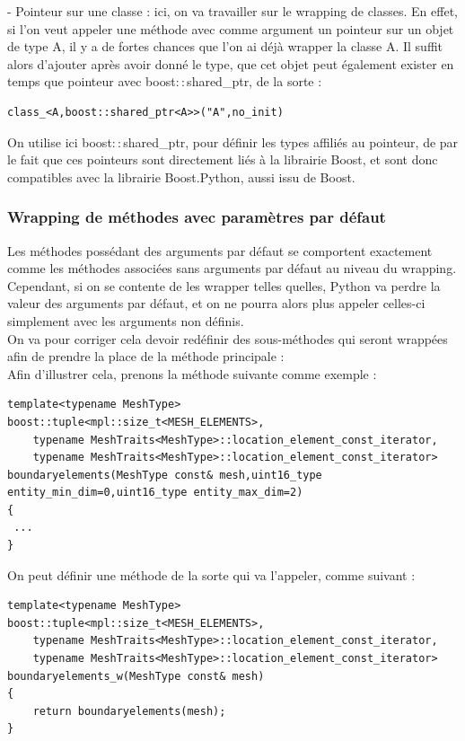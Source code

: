 \documentclass[french,12pt]{article}
\begin{document}
- Pointeur sur une classe : ici, on va travailler sur le wrapping de classes. En effet, si l'on veut appeler une méthode avec comme argument un pointeur sur un objet de type A, il y a de fortes chances que l'on ai déjà wrapper la classe A. 
Il suffit alors d'ajouter après avoir donné le type,  que cet objet peut également exister en temps que pointeur avec boost$::$shared\_ptr, de la sorte :
\begin{lstlisting}
class_<A,boost::shared_ptr<A>>("A",no_init)
\end{lstlisting}

On utilise ici boost$::$shared\_ptr, pour définir les types affiliés au pointeur, de par le fait que ces pointeurs sont directement liés à la librairie Boost, et sont donc compatibles avec la librairie Boost.Python, aussi issu de Boost.

\subsubsection{Wrapping de méthodes avec paramètres par défaut}

Les méthodes possédant des arguments par défaut se comportent exactement comme les méthodes associées sans arguments par défaut au niveau du wrapping. Cependant,  si on se contente de les wrapper telles quelles, Python va perdre la valeur des arguments par défaut, et on ne pourra alors plus appeler celles-ci simplement avec les arguments non définis.\\
On va pour corriger cela devoir redéfinir des sous-méthodes qui seront wrappées afin de prendre la place de la méthode principale : \\

Afin d’illustrer cela, prenons la méthode suivante comme exemple :
\begin{lstlisting}
template<typename MeshType>
boost::tuple<mpl::size_t<MESH_ELEMENTS>,
	typename MeshTraits<MeshType>::location_element_const_iterator,
	typename MeshTraits<MeshType>::location_element_const_iterator>
boundaryelements(MeshType const& mesh,uint16_type entity_min_dim=0,uint16_type entity_max_dim=2)
{
 ...
}
\end{lstlisting}

On peut définir une méthode de la sorte qui va l'appeler, comme suivant :
\begin{lstlisting}
template<typename MeshType>
boost::tuple<mpl::size_t<MESH_ELEMENTS>,
	typename MeshTraits<MeshType>::location_element_const_iterator,
	typename MeshTraits<MeshType>::location_element_const_iterator>
boundaryelements_w(MeshType const& mesh)
{
 	return boundaryelements(mesh);
}
\end{lstlisting}
\end{document}
